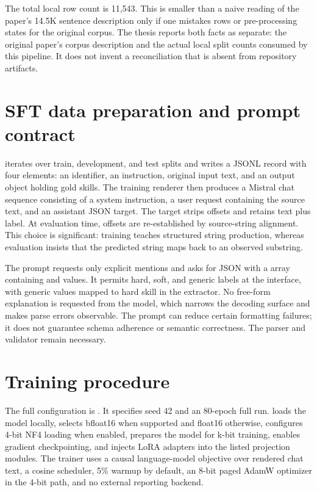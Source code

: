 The total local row count is 11,543. This is smaller than a naive reading of the paper's 14.5K sentence description only if one mistakes rows or pre-processing states for the original corpus. The thesis reports both facts as separate: the original paper's corpus description and the actual local split counts consumed by this pipeline. It does not invent a reconciliation that is absent from repository artifacts.

\section{SFT data preparation and prompt contract}

 iterates over train, development, and test splits and writes a JSONL record with four elements: an identifier, an instruction, original input text, and an output object holding gold skills. The training renderer then produces a Mistral chat sequence consisting of a system instruction, a user request containing the source text, and an assistant JSON target. The target strips offsets and retains text plus label. At evaluation time, offsets are re-established by source-string alignment. This choice is significant: training teaches structured string production, whereas evaluation insists that the predicted string maps back to an observed substring.

The prompt requests only explicit mentions and asks for JSON with a  array containing  and  values. It permits hard, soft, and generic  labels at the interface, with generic values mapped to hard skill in the extractor. No free-form explanation is requested from the model, which narrows the decoding surface and makes parse errors observable. The prompt can reduce certain formatting failures; it does not guarantee schema adherence or semantic correctness. The parser and validator remain necessary.

\section{Training procedure}

The full configuration is . It specifies seed 42 and an 80-epoch full run.  loads the model locally, selects bfloat16 when supported and float16 otherwise, configures 4-bit NF4 loading when enabled, prepares the model for k-bit training, enables gradient checkpointing, and injects LoRA adapters into the listed projection modules. The trainer uses a causal language-model objective over rendered chat text, a cosine scheduler, 5\% warmup by default, an 8-bit paged AdamW optimizer in the 4-bit path, and no external reporting backend.

